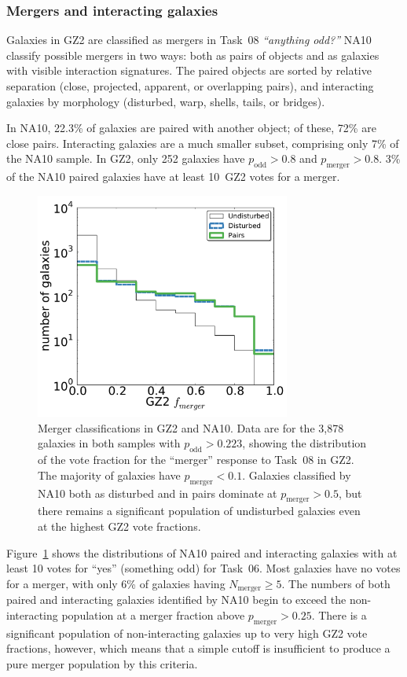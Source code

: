 \documentclass[useAMS,usenatbib]{mn2e}
\begin{document}
\subsubsection{Mergers and interacting galaxies}

Galaxies in GZ2 are classified as mergers in Task~08 {\it ``anything odd?''} NA10 classify possible mergers in two ways: both as pairs of objects and as galaxies with visible interaction signatures. The paired objects are sorted by relative separation (close, projected, apparent, or overlapping pairs), and interacting galaxies by morphology (disturbed, warp, shells, tails, or bridges). 

In NA10, 22.3\% of galaxies are paired with another object; of these, 72\% are close pairs. Interacting galaxies are a much smaller subset, comprising only 7\% of the NA10 sample. In GZ2, only 252 galaxies have $p_\mathrm{odd}>0.8$ and $p_\mathrm{merger}>0.8$. 3\% of the NA10 paired galaxies have at least 10~GZ2 votes for a merger. 

\begin{figure}
\includegraphics[angle=0,width=3.3in]{figures/na_mergers_new.pdf}
\caption{Merger classifications in GZ2 and NA10. Data are for the 3,878 galaxies in both samples with $p_\mathrm{odd}>0.223$, showing the distribution of the vote fraction for the ``merger'' response to Task~08 in GZ2. The majority of galaxies have $p_\mathrm{merger}<0.1$. Galaxies classified by NA10 both as disturbed and in pairs dominate at $p_\mathrm{merger}>0.5$, but there remains a significant population of undisturbed galaxies even at the highest GZ2 vote fractions.
\label{fig-na_pairs}}
\end{figure}

Figure~\ref{fig-na_pairs} shows the distributions of NA10 paired and interacting galaxies with at least 10 votes for ``yes'' (something odd) for Task~06. Most galaxies have no votes for a merger, with only 6\% of galaxies having $N_\mathrm{merger}\ge5$. The numbers of both paired and interacting galaxies identified by NA10 begin to exceed the non-interacting population at a merger fraction above $p_\mathrm{merger}>0.25$. There is a significant population of non-interacting galaxies up to very high GZ2 vote fractions, however, which means that a simple cutoff is insufficient to produce a pure merger population by this criteria. 
\end{document}
